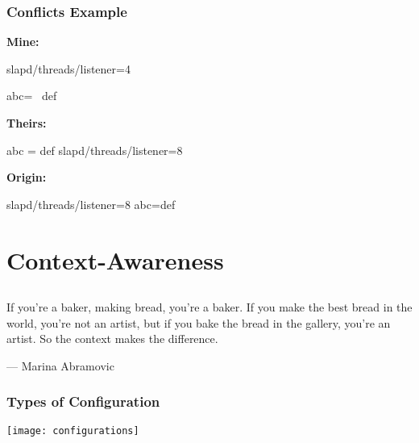 \begin{frame}[fragile]
	\frametitle{Conflicts Example}

	\textbf{Mine:}
	\begin{code}[gobble=4,language=CfgElektra]
	slapd/threads/listener=4

	abc= \
		def
	\end{code}

	\textbf{Theirs:}
	\begin{code}[gobble=4,language=CfgElektra]
	abc = def
	slapd/threads/listener=8
	\end{code}

	\pause
	\textbf{Origin:}
	\begin{code}[gobble=4,language=CfgElektra]
	slapd/threads/listener=8
	abc=def
	\end{code}
\end{frame}

\section{Context-Awareness}

\subsection{}

\begin{frame}
	If you're a baker, making bread, you're a baker. If you make the best bread in the world, you're not an artist, but if you bake the bread in the gallery, you're an artist. So the context makes the difference.\par\raggedleft--- \textup{Marina Abramovic}
\end{frame}

\begin{frame}
\end{frame}

\begin{frame}
	\frametitle{Types of Configuration}
	\begin{description}
	\end{description}
\end{frame}

\begin{frame}
	\hspace*{-1em}\texttt{[image: configurations]}
\end{frame}

